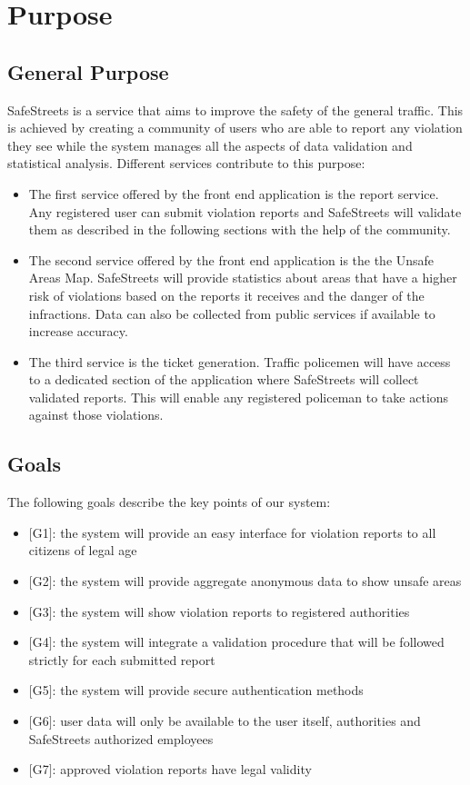 \section{Purpose}

\subsection{General Purpose}
SafeStreets is a service that aims to improve the safety of the general traffic.
This is achieved by creating a community of users who are able to report any violation they see while the system manages
all the aspects of data validation and statistical analysis.
Different services contribute to this purpose:
\begin{itemize}
  \item The first service offered by the front end application is the report service. Any registered user can submit violation reports and SafeStreets will validate them as described in the following sections with the help of the community.
  \item The second service offered by the front end application is the the Unsafe Areas Map. SafeStreets will provide statistics about areas that have a higher risk of violations based on the reports it receives and the danger of the infractions. Data can also be collected from public services if available to increase accuracy.
  \item The third service is the ticket generation. Traffic policemen will have access to a dedicated section of the application where SafeStreets will collect validated reports. This will enable any registered policeman to take actions against those violations.
\end{itemize}

\subsection{Goals}
The following goals describe the key points of our system:
\begin{itemize}
  \item $[$G1$]$: the system will provide an easy interface for violation reports to all citizens of legal age
  \item $[$G2$]$: the system will provide aggregate anonymous data to show unsafe areas
  \item $[$G3$]$: the system will show violation reports to registered authorities
  \item $[$G4$]$: the system will integrate a validation procedure that will be followed strictly for each submitted report
  \item $[$G5$]$: the system will provide secure authentication methods
  \item $[$G6$]$: user data will only be available to the user itself, authorities and SafeStreets authorized employees
  \item $[$G7$]$: approved violation reports have legal validity
\end{itemize}